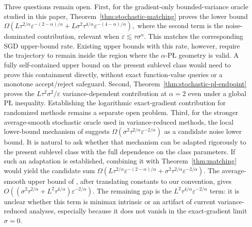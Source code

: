 \documentclass[11pt]{article}
\begin{document}
Three questions remain open. First, for the gradient-only bounded-variance oracle studied in this paper, Theorem~\ref{thm:stochastic-matching}
proves the lower bound $\Omega\left(
L\tau^{2/\alpha}\varepsilon^{-(2-\alpha)/\alpha}
 + L\sigma^2\tau^{4/\alpha}\varepsilon^{-(4-\alpha)/\alpha}
\right),$ where the second term is the noise-dominated contribution, relevant when
\(\varepsilon\lesssim\tau\sigma^\alpha\). This matches the corresponding SGD upper-bound rate. Existing upper bounds
with this rate, however,
require the trajectory to remain inside the region where the \(\alpha\)-P\L{} geometry is valid. A fully
self-contained upper bound on the present sublevel class would need to prove this containment directly, without exact
function-value queries or a monotone accept/reject safeguard.
Second, Theorem~\ref{thm:stochastic-pl-endpoint} proves the
$L\tau^2\sigma^2/\varepsilon$ variance-dependent contribution at $\alpha=2$ even under a global P\L{} inequality.
Establishing the logarithmic exact-gradient contribution for randomized methods remains a separate open problem.
Third, for the stronger average-smooth stochastic oracle used in variance-reduced methods, the local lower-bound
mechanism of \citet{MasihaSalehkaleybarHeKiyavashThiran2026} suggests
\(\Omega(\sigma^2\tau^{2/\alpha}\varepsilon^{-2/\alpha})\) as a candidate noise lower bound. It is natural to ask
whether that mechanism can be adapted rigorously to the present sublevel class with the full dependence on the class
parameters. If such an adaptation is established, combining it with Theorem~\ref{thm:matching} would yield the
candidate sum
\(\Omega(L\tau^{2/\alpha}\varepsilon^{-(2-\alpha)/\alpha}+\sigma^2\tau^{2/\alpha}\varepsilon^{-2/\alpha})\).
The average-smooth upper bound of \citet{FatkhullinEtesamiHeKiyavash2022}, after translating constants to our convention, gives
\(O((\sigma^2\tau^{2/\alpha}+L^2\tau^{4/\alpha})\varepsilon^{-2/\alpha})\). The remaining gap is the
\(L^2\tau^{4/\alpha}\varepsilon^{-2/\alpha}\) term: it is unclear whether this term is minimax intrinsic or an
artifact of current variance-reduced analyses, especially because it does not vanish in the exact-gradient limit
\(\sigma=0\).






\appendix
\end{document}
